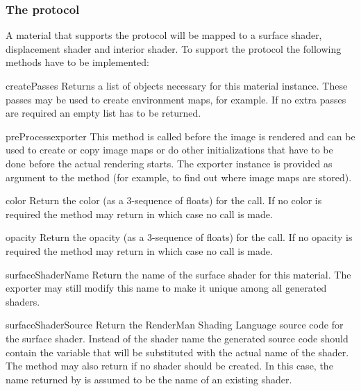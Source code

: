 \subsubsection{The  protocol}

A material that supports the  protocol will be mapped
to a surface shader, displacement shader and interior shader. To support
the  protocol the following methods have to be implemented:

\begin{methoddesc}[IMaterial]{createPasses}{}
Returns a list of  objects necessary for this material
instance. These passes may be used to create environment maps, for example.
If no extra passes are required an empty list has to be returned.
\end{methoddesc}

\begin{methoddesc}[IMaterial]{preProcess}{exporter}
This method is called before the image is rendered and can be used to
create or copy image maps or do other initializations that have to be done
before the actual rendering starts. The exporter instance is provided
as argument to the method (for example, to find out where image maps
are stored).
\end{methoddesc}

\begin{methoddesc}[IMaterial]{color}{}
Return the color (as a 3-sequence of floats) for the 
call. If no color is required the method may return  in which
case no  call is made.
\end{methoddesc}

\begin{methoddesc}[IMaterial]{opacity}{}
Return the opacity (as a 3-sequence of floats) for the 
call. If no opacity is required the method may return  in which
case no  call is made.
\end{methoddesc}

\begin{methoddesc}[IMaterial]{surfaceShaderName}{}
Return the name of the surface shader for this material. The exporter
may still modify this name to make it unique among all generated
shaders.
\end{methoddesc}

\begin{methoddesc}[IMaterial]{surfaceShaderSource}{}
Return the RenderMan Shading Language source code for the surface shader.
Instead of the shader name the generated source code should contain
the variable  that will be substituted with the
actual name of the shader. The method may also return  if
no shader should be created. In this case, the name returned by
 is assumed to be the name of an existing shader.
\end{methoddesc}

